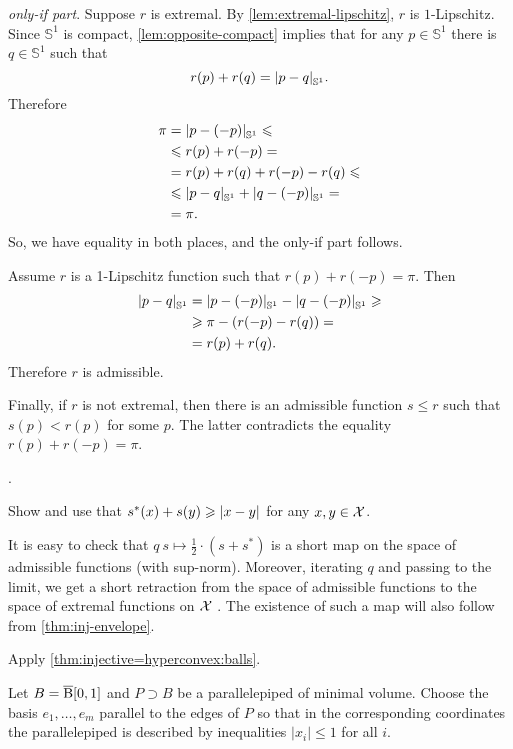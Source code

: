 \parbf{\ref{ex:circle};} \textit{only-if part}.
Suppose $r$ is extremal.
By \ref{lem:extremal-lipschitz}, $r$ is $1$-Lipschitz.
Since $\mathbb{S}^1$ is compact, \ref{lem:opposite-compact} implies that for any $p\in \mathbb{S}^1$ there is $q\in \mathbb{S}^1$ such that 
\[r(p)+r (q) = \dist{p}{q}{\mathbb{S}^1}.\]
Therefore
\begin{align*}
\pi&=\dist{p}{(-p)}{\mathbb{S}^1}\le 
\\
&\le 
r(p)+r(-p)=
\\
&=
r(p)+r(q) +r(-p) -r(q)\le
\\
&\le
\dist{p}{q}{\mathbb{S}^1}+\dist{q}{(-p)}{\mathbb{S}^1}=
\\
&=\pi.
\end{align*}
So, we have equality in both places, and the only-if part follows.

Assume $r$ is a 1-Lipschitz function such that $r(p)+r(-p)=\pi$.
Then 
\begin{align*}
\dist pq{\mathbb{S}^1}&=
\dist{p}{(-p)}{\mathbb{S}^1}-\dist{q}{(-p)}{\mathbb{S}^1}\ge
\\
&\ge\pi -(r(-p)-r(q))=
\\
&=r(p)+r(q).
\end{align*}
Therefore $r$ is admissible.

Finally, if $r$ is not extremal, then there is an admissible function $s\le r$ such that $s(p)<r(p)$ for some $p$.
The latter contradicts the equality $r(p)+r(-p)=\pi$.

 \cite[Proposition 2.7]{zuest}.

Show and use that
$s^*(x)+s(y)\ge \dist{x}{y}{}$
for any $x,y\in \mathcal{X}$.

It is easy to check that $q\:s\mapsto \tfrac12\cdot(s+s^*)$ is a short map on the space of admissible functions (with sup-norm).
Moreover, iterating $q$ and passing to the limit, we get a short retraction from the space of admissible functions to the space of extremal functions on $\mathcal{X}$ \cite[see 3.1 in][]{lang-2013}.
The existence of such a map will also follow from \ref{thm:inj-envelope}.

Apply \ref{thm:injective=hyperconvex:balls}.

Let $B=\overline{\mathrm{B}}{}[0,1]$ and $P\supset B$ be a parallelepiped of minimal volume.
Choose the basis $e_1,\dots,e_m$ parallel to the edges of $P$ so that in the corresponding coordinates the parallelepiped is described by inequalities
$|x_i|\le 1$ for all $i$.

